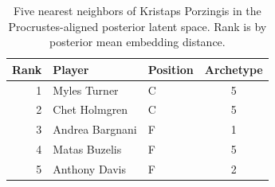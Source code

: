\begin{table}[htbp]
  \centering\small
  \begin{tabular}{rllc}
    \toprule
    Rank & Player & Position & Archetype \\
    \midrule
    1 & Myles Turner & C & 5 \\
    2 & Chet Holmgren & C & 5 \\
    3 & Andrea Bargnani & F & 1 \\
    4 & Matas Buzelis & F & 5 \\
    5 & Anthony Davis & F & 2 \\
    \bottomrule
  \end{tabular}
  \caption{Five nearest neighbors of Kristaps Porzingis in the Procrustes-aligned posterior latent space. Rank is by posterior mean embedding distance.}
  \label{tab:Kristaps_Porzingis_neighbors}
\end{table}

